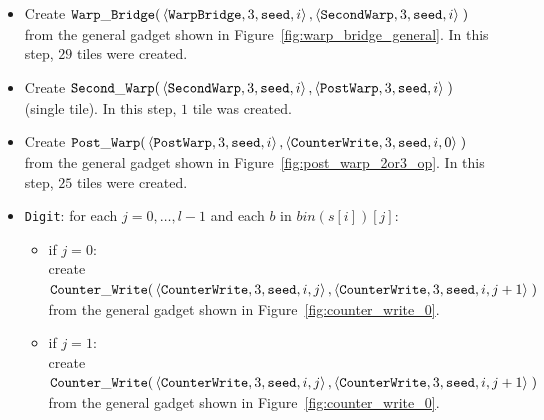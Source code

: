 \begin{itemize}
    \item Create
    $\begin{aligned}[t]
        {\tt Warp\_Bridge}(&\left\langle {\tt WarpBridge}, 3, {\tt seed}, i \right\rangle,
                     \left\langle {\tt SecondWarp}, 3, {\tt seed}, i \right\rangle \;)
    \end{aligned}$\\ from the general gadget shown in Figure~\ref{fig:warp_bridge_general}.
    In this step, $29$ tiles were created.

    \item Create
    $\begin{aligned}[t]
        {\tt Second\_Warp}(&\left\langle {\tt SecondWarp}, 3, {\tt seed}, i  \right\rangle,
                     \left\langle {\tt PostWarp},   3, {\tt seed}, i  \right\rangle \;)
    \end{aligned}$ (single tile).
    In this step, $1$ tile was created.

    \item Create
    $\begin{aligned}[t]
        {\tt Post\_Warp}(&\left\langle {\tt PostWarp},     3, {\tt seed}, i    \right\rangle,
                   \left\langle {\tt CounterWrite}, 3, {\tt seed}, i, 0 \right\rangle \;)
    \end{aligned}$\\from the general gadget shown in Figure~\ref{fig:post_warp_2or3_op}.
    In this step, $25$ tiles were created.

    \item {\tt Digit}: for each $j=0,\ldots,l-1$ and each $b$ in $bin(s[i])[j]$:
    \begin{itemize}
        \item if $j = 0$:\\ create
        $\begin{aligned}[t]
            {\tt Counter\_Write}(&\left\langle {\tt CounterWrite}, 3, {\tt seed}, i, j \right\rangle, \left\langle {\tt CounterWrite}, 3, {\tt seed}, i, j + 1 \right\rangle \;)
        \end{aligned}$\\from the general gadget shown in Figure~\ref{fig:counter_write_0}.

        \item if $j = 1$:\\ create
        $\begin{aligned}[t]
            {\tt Counter\_Write}(&\left\langle {\tt CounterWrite}, 3, {\tt seed}, i, j \right\rangle, \left\langle {\tt CounterWrite}, 3, {\tt seed}, i, j + 1 \right\rangle \;)
        \end{aligned}$\\from the general gadget shown in Figure~\ref{fig:counter_write_0}.


\end{itemize}
\end{itemize}
